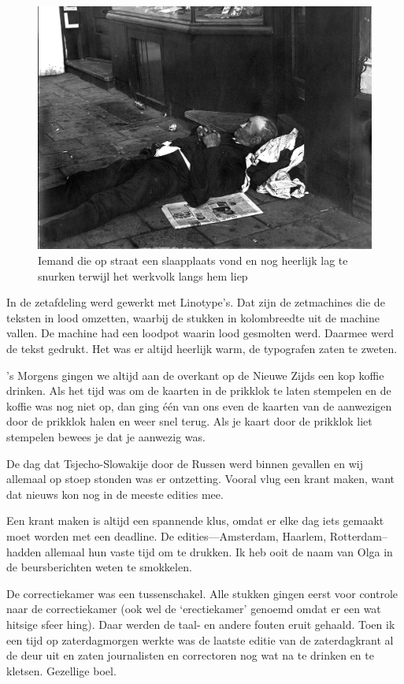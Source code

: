 \documentclass[10pt,twoside, openright]{memoir}
\begin{document}
\begin{figure}
\includegraphics[width=\textwidth]{img/ch39/rustzacht}
\caption*{\footnotesize Iemand die op straat een slaapplaats vond en nog heerlijk lag te snurken terwijl het werkvolk langs hem liep}
\end{figure}

In de zetafdeling werd gewerkt met Linotype's. Dat zijn de zetmachines die de teksten in lood omzetten, waarbij de stukken in kolombreedte uit de machine vallen. De machine had een loodpot waarin lood gesmolten werd. Daarmee werd de tekst gedrukt. Het was er altijd heerlijk warm, de typografen zaten te zweten.

's Morgens gingen we altijd aan de overkant op de Nieuwe Zijds een kop koffie drinken. Als het tijd was om de kaarten in de prikklok te laten stempelen en de koffie was nog niet op, dan ging één van ons even de kaarten van de aanwezigen door de prikklok halen en weer snel terug. Als je kaart door de prikklok liet stempelen bewees je dat je aanwezig was.

De dag dat Tsjecho-Slowakije door de Russen werd 
binnen gevallen en wij allemaal op stoep stonden was er ontzetting. Vooral vlug een krant maken, want dat nieuws kon nog in de meeste edities mee. 

Een krant maken is altijd een spannende klus, omdat er elke dag iets gemaakt moet worden met een deadline. De edities---Amsterdam, Haarlem, Rotterdam--hadden allemaal hun vaste tijd om te drukken. Ik heb ooit de naam van Olga in de beursberichten weten te smokkelen. 

De correctiekamer was een tussenschakel. Alle stukken gingen eerst voor controle naar de correctiekamer (ook wel de `erectiekamer' genoemd omdat er een wat hitsige sfeer hing). Daar werden de taal- en andere fouten eruit gehaald. Toen ik een tijd op zaterdagmorgen werkte was de laatste editie van de zaterdagkrant al de deur uit en zaten journalisten en correctoren nog wat na te drinken en te kletsen. Gezellige boel. 
\end{document}
